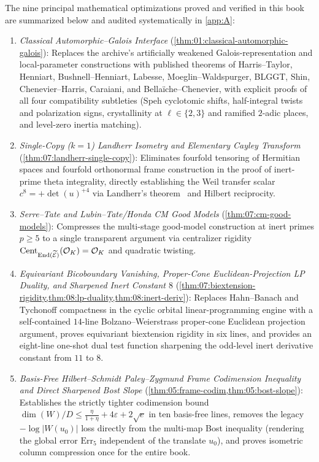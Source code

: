 The nine principal mathematical optimizations proved and verified in this book are summarized below and audited systematically in \cref{app:A}:
\begin{enumerate}[label=\textbf{O\arabic*.}]
\item \emph{Classical Automorphic--Galois Interface} (\cref{thm:01:classical-automorphic-galois}): Replaces the archive's artificially weakened Galois-representation and local-parameter constructions with published theorems of Harris--Taylor, Henniart, Bushnell--Henniart, Labesse, Moeglin--Waldspurger, BLGGT, Shin, Chenevier--Harris, Caraiani, and Bella\"iche--Chenevier, with explicit proofs of all four compatibility subtleties (Speh cyclotomic shifts, half-integral twists and polarization signs, crystallinity at $\ell \in \{2,3\}$ and ramified $2$-adic places, and level-zero inertia matching).
\item \emph{Single-Copy ($k=1$) Landherr Isometry and Elementary Cayley Transform} (\cref{thm:07:landherr-single-copy}): Eliminates fourfold tensoring of Hermitian spaces and fourfold orthonormal frame construction in the proof of inert-prime theta integrality, directly establishing the Weil transfer scalar $c^8 = +\det(u)^{+4}$ via Landherr's theorem~\cite{Landherr1936} and Hilbert reciprocity.
\item \emph{Serre--Tate and Lubin--Tate/Honda CM Good Models} (\cref{thm:07:cm-good-models}): Compresses the multi-stage good-model construction at inert primes $p \ge 5$ to a single transparent argument via centralizer rigidity $\operatorname{Cent}_{\mathrm{End}(\widetilde{\mathcal{E}})}(\mathcal{O}_K) = \mathcal{O}_K$ and quadratic twisting.
\item \emph{Equivariant Bicoboundary Vanishing, Proper-Cone Euclidean-Projection LP Duality, and Sharpened Inert Constant $8$} (\cref{thm:07:biextension-rigidity,thm:08:lp-duality,thm:08:inert-deriv}): Replaces Hahn--Banach and Tychonoff compactness in the cyclic orbital linear-programming engine with a self-contained $14$-line Bolzano--Weierstrass proper-cone Euclidean projection argument, proves equivariant biextension rigidity in six lines, and provides an eight-line one-shot dual test function sharpening the odd-level inert derivative constant from $11$ to $8$.
\item \emph{Basis-Free Hilbert--Schmidt Paley--Zygmund Frame Codimension Inequality and Direct Sharpened Bost Slope} (\cref{thm:05:frame-codim,thm:05:bost-slope}): Establishes the strictly tighter codimension bound $\dim(W)/D \le \frac{\eta}{1+\eta} + 4\varepsilon + 2\sqrt{e}$ in ten basis-free lines, removes the legacy $-\log|W(u_0)|$ loss directly from the multi-map Bost inequality (rendering the global error $\mathrm{Err}_5$ independent of the translate $u_0$), and proves isometric column compression once for the entire book.

\end{enumerate}
